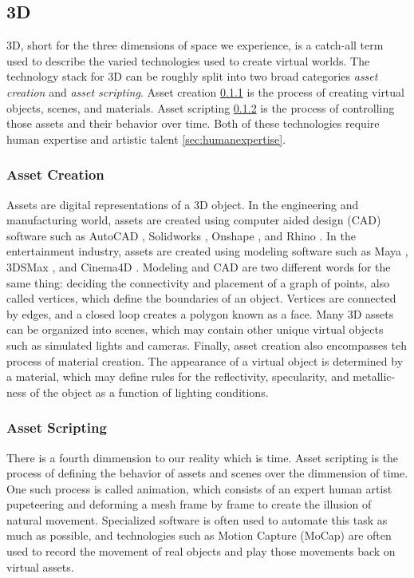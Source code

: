 \documentclass{article}
\begin{document}
\subsection{3D}
\label{sec:3d}

3D, short for the three dimensions of space we experience, is a catch-all term used to describe the varied technologies used to create virtual worlds. The technology stack for 3D can be roughly split into two broad categories \emph{asset creation} and \emph{asset scripting}. Asset creation \ref{sec:assetcreation} is the process of creating virtual objects, scenes, and materials. Asset scripting \ref{sec:assetscripting} is the process of controlling those assets and their behavior over time. Both of these technologies require human expertise and artistic talent \ref{sec:humanexpertise}.
 
\subsubsection{Asset Creation}
\label{sec:assetcreation}

Assets are digital representations of a 3D object. In the engineering and manufacturing world, assets are created using computer aided design (CAD) software such as AutoCAD \citep{autocad}, Solidworks \citep{solidworks}, Onshape \citep{onshape}, and Rhino \citep{rhino}. In the entertainment industry, assets are created using modeling software such as Maya \citep{maya}, 3DSMax \citep{3dsmax}, and Cinema4D \citep{cinema4d}. Modeling and CAD are two different words for the same thing: deciding the connectivity and placement of a graph of points, also called vertices, which define the boundaries of an object. Vertices are connected by edges, and a closed loop creates a polygon known as a face. Many 3D assets can be organized into scenes, which may contain other unique virtual objects such as simulated lights and cameras. Finally, asset creation also encompasses teh process of material creation. The appearance of a virtual object is determined by a material, which may define rules for the reflectivity, specularity, and metallic-ness of the object as a function of lighting conditions.

\subsubsection{Asset Scripting}
\label{sec:assetscripting}

There is a fourth dimmension to our reality which is time. Asset scripting is the process of defining the behavior of assets and scenes over the dimmension of time. One such process is called animation, which consists of an expert human artist pupeteering and deforming a mesh frame by frame to create the illusion of natural movement. Specialized software is often used to automate this task as much as possible, and technologies such as Motion Capture (MoCap) are often used to record the movement of real objects and play those movements back on virtual assets.
\end{document}
